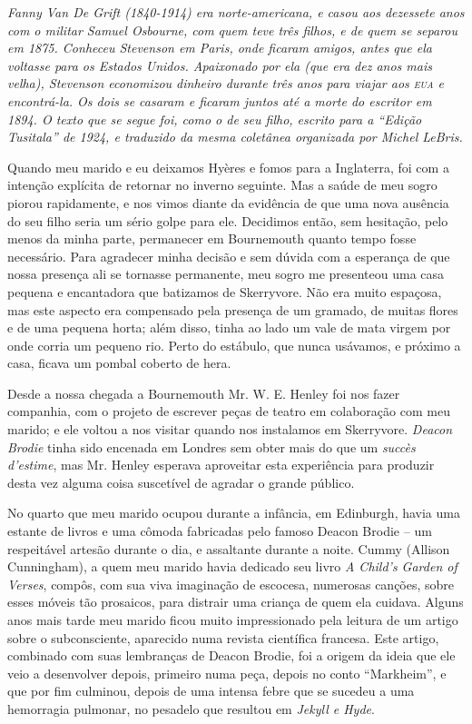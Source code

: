 {\itshape Fanny Van De Grift (1840-1914) era norte-americana, e casou aos
dezessete anos com o militar Samuel Osbourne, com quem teve três
filhos, e de quem se separou em 1875.  Conheceu Stevenson em
Paris, onde ficaram amigos, antes que ela voltasse para os Estados
Unidos.  Apaixonado por ela (que era dez anos mais velha), Stevenson
economizou dinheiro durante três anos para viajar aos \emph{\textsc{eua}} e
encontrá-la.  Os dois se casaram e ficaram juntos até a morte do
escritor em 1894. O texto que se segue foi, como o de seu filho,
escrito para a “Edição Tusitala” de 1924, e traduzido da mesma
coletânea organizada por Michel LeBris.}

\clearpage

Quando meu marido e eu deixamos Hyères e fomos para a Inglaterra, foi
com a intenção explícita de retornar no inverno seguinte.  Mas a saúde
de meu sogro piorou rapidamente, e nos vimos diante da evidência de que
uma nova ausência do seu filho seria um sério golpe para ele. 
Decidimos então, sem hesitação, pelo menos da minha parte, permanecer
em Bournemouth quanto tempo fosse necessário.  Para agradecer minha
decisão e sem dúvida com a esperança de que nossa presença ali se
tornasse permanente, meu sogro me presenteou uma casa pequena e
encantadora que batizamos de Skerryvore.  Não era muito espaçosa, mas
este aspecto era compensado pela presença de um gramado, de muitas
flores e de uma pequena horta; além disso, tinha ao lado um vale de
mata virgem por onde corria um pequeno rio.  Perto do estábulo, que
nunca usávamos, e próximo a casa, ficava um pombal coberto de hera.

Desde a nossa chegada a Bournemouth Mr. W. E. Henley foi nos fazer
companhia, com o projeto de escrever peças de teatro em colaboração com
meu marido; e ele voltou a nos visitar quando nos instalamos em
Skerryvore.  \textit{Deacon Brodie} tinha sido encenada em Londres sem
obter mais do que um \textit{succès d’estime}, mas Mr. Henley esperava
aproveitar esta experiência para produzir desta vez alguma coisa
suscetível de agradar o grande público.

No quarto que meu marido ocupou durante a infância, em Edinburgh, havia
uma estante de livros e uma cômoda fabricadas pelo famoso Deacon Brodie
-- um respeitável artesão durante o dia, e assaltante durante a noite. 
Cummy (Allison Cunningham), a quem meu marido havia dedicado seu livro
\textit{A Child’s Garden of Verses}, compôs, com sua viva imaginação de
escocesa, numerosas canções, sobre esses móveis tão prosaicos, para
distrair uma criança de quem ela cuidava.  Alguns anos mais tarde meu
marido ficou muito impressionado pela leitura de um artigo sobre o
subconsciente, aparecido numa revista científica francesa.  Este
artigo, combinado com suas lembranças de Deacon Brodie, foi a origem da
ideia que ele veio a desenvolver depois, primeiro numa peça, depois no
conto “Markheim”, e que por fim culminou, depois de uma intensa febre
que se sucedeu a uma hemorragia pulmonar, no pesadelo que resultou em
\textit{Jekyll e Hyde}.


